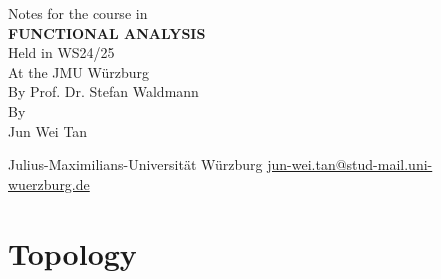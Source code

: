 \documentclass[twoside,symmetric, openany, 12pt]{./tuftebook}
\theoremstyle{definition}
\theoremstyle{definition}
\theoremstyle{definition}
\begin{document}
\begin{titlepage}
	{\begingroup%
		\centering
		{\Large Notes for the course in}\\[\baselineskip]
		{\Huge\bfseries FUNCTIONAL ANALYSIS}\\[\baselineskip]
		{\Large Held in WS24/25\\ At the JMU Würzburg\\ By Prof. Dr. Stefan Waldmann}\\[\baselineskip]
		{\LARGE By}\\[\baselineskip]
		{\LARGE Jun Wei Tan}\par
		\vfill
		{Julius-Maximilians-Universit\"{a}t W\"{u}rzburg}
		\vfill
		{\small\sffamily \href{mailto:jun-wei.tan@stud-mail.uni-wuerzburg.de}{jun-wei.tan@stud-mail.uni-wuerzburg.de}}\par
		\endgroup}
\end{titlepage}
\restoregeometry
	\tableofcontents
	\chapter{Topology}
\end{document}
